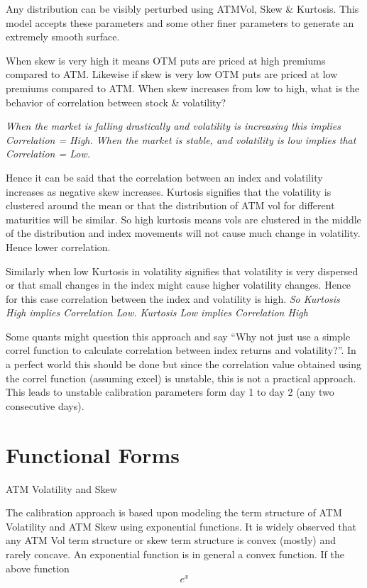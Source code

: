 \documentclass[a4paper, 12pt]{article}
\begin{document}
Any distribution can be visibly perturbed using ATMVol, Skew \& Kurtosis. This model accepts these parameters and some other finer parameters to generate an extremely smooth surface. 

When skew is very high it means OTM puts are priced at high premiums compared to ATM. Likewise if skew is very low OTM puts are priced at low premiums compared to ATM. When skew increases from low to high, what is the behavior of correlation between stock \& volatility?

\emph{ When the market is falling drastically and volatility is increasing this implies Correlation = High. When the market is stable, and volatility is low implies that Correlation = Low.}

\color{black}
Hence it can be said that the correlation between an index and volatility increases as negative skew increases.
Kurtosis signifies that the volatility is clustered around the mean or that the distribution of ATM vol for different maturities will be similar. So high kurtosis means vols are clustered in the middle of the distribution and index movements will not cause much change in volatility. Hence lower correlation.

Similarly when low Kurtosis in volatility signifies that volatility is very dispersed or that small changes in the index might cause higher volatility changes. Hence for this case correlation between the index and volatility is high. 
\emph{ So Kurtosis High implies Correlation Low. Kurtosis Low implies Correlation High}
\color{black}


Some quants might question this approach and say “Why not just use a simple correl function to calculate correlation between index returns and volatility?”. In a perfect world this should be done but since the correlation value obtained using the correl function (assuming excel) is unstable, this is not a practical approach. This leads to unstable calibration parameters form day 1 to day 2 (any two consecutive days). 

\section{Functional Forms}

{ATM Volatility and Skew}

\normalfont
The calibration approach is based upon modeling the term structure of ATM Volatility and ATM Skew using exponential functions. It is widely observed that any ATM Vol term structure or skew term structure is convex (mostly) and rarely concave. An exponential function is in general a convex function. If the above function 
\begin{equation}
{ e^{x} }
\end{equation}
\end{document}
